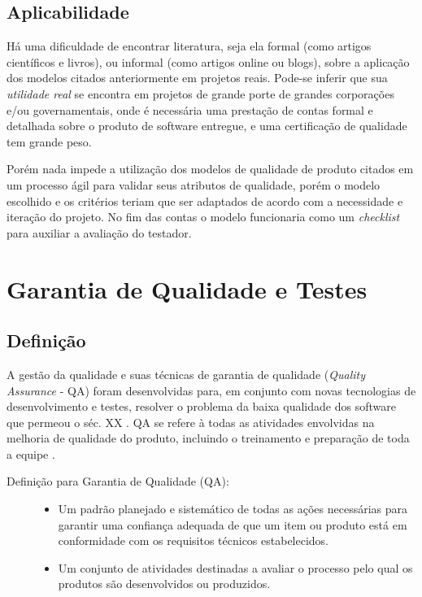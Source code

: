\documentclass[
	12pt,				%
	openright,			%
	oneside,			%
	a4paper,			%
	english,			%
	brazil,				%
	]{abntex2}
\begin{document}
\section{Aplicabilidade}
Há uma dificuldade de encontrar literatura, seja ela formal (como artigos científicos e livros), ou informal (como artigos online ou blogs), sobre a aplicação dos modelos citados anteriormente em projetos reais. Pode-se inferir que sua \emph{utilidade real} se encontra em projetos de grande porte de grandes corporações e/ou governamentais, onde é necessária uma prestação de contas formal e detalhada sobre o produto de software entregue, e uma certificação de qualidade tem grande peso.

Porém nada impede a utilização dos modelos de qualidade de produto citados em um processo ágil para validar seus atributos de qualidade, porém o modelo escolhido e os critérios teriam que ser adaptados de acordo com a necessidade e iteração do projeto. No fim das contas o modelo funcionaria como um \emph{checklist} para auxiliar a avaliação do testador.

\chapter{Garantia de Qualidade e Testes}

\section{Definição}
A gestão da qualidade e suas técnicas de garantia de qualidade (\emph{Quality Assurance} - QA) foram desenvolvidas para, em conjunto com novas tecnologias de desenvolvimento e testes, resolver o problema da baixa qualidade dos software que permeou o séc. XX \cite{SOMMERVILLE2011}. QA se refere à todas as atividades envolvidas na melhoria de qualidade do produto, incluindo o treinamento e preparação de toda a equipe \cite{tsui2013}.

\begin{description}
    \item[Definição  para Garantia de Qualidade (QA):] \hfill
        \begin{itemize}
            \item Um padrão planejado e sistemático de todas as ações necessárias para garantir uma confiança adequada de que um item ou produto está em conformidade com os requisitos técnicos estabelecidos.
            \item Um conjunto de atividades destinadas a avaliar o processo pelo qual os produtos são desenvolvidos ou produzidos.
        \end{itemize}
\end{description}
\end{document}
